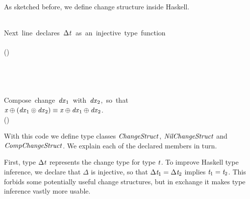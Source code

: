 As sketched before, we define change structure inside Haskell.
\begin{hscode}\SaveRestoreHook
{}%
%
%
\>[B]{}\;\;\;\<[E]%
\\
\>[B]{}\<[3]%
\>[3]{}\mbox{\onelinecomment  Next line declares \ensuremath{\Delta \Varid{t}} as an injective type function}{}\<[E]%
\\
\>[B]{}\<[3]%
\>[3]{}\;\Delta {}\mathrel{=}\mid {}\to {}\<[E]%
\\[\blanklineskip]%
\>[B]{}\<[3]%
\>[3]{}(\oplus)\mathrel{:\mkern-1mu:}\to \Delta {}\to {}\<[E]%
\\
\>[B]{}\<[3]%
\>[3]{}\mathrel{:\mkern-1mu:}\to \Delta {}\<[E]%
\\[\blanklineskip]%
\>[B]{}\;\;\Rightarrow{}\;\;\<[E]%
\\
\>[B]{}\<[3]%
\>[3]{}\NilC{}\mathrel{:\mkern-1mu:}\to \Delta {}\<[E]%
\\[\blanklineskip]%
\>[B]{}\;\;\Rightarrow{}\;\;\<[E]%
\\
\>[B]{}\<[3]%
\>[3]{}\mbox{\onelinecomment  Compose change \ensuremath{\Varid{dx}_{1}} with \ensuremath{\Varid{dx}_{2}}, so that}{}\<[E]%
\\
\>[B]{}\<[3]%
\>[3]{}\mbox{\onelinecomment  \ensuremath{\Varid{x}\oplus (\Varid{dx}_{1}\circledcirc \Varid{dx}_{2})\equiv\Varid{x}\oplus \Varid{dx}_{1}\oplus \Varid{dx}_{2}}.}{}\<[E]%
\\
\>[B]{}\<[3]%
\>[3]{}(\circledcirc )\mathrel{:\mkern-1mu:}\Delta {}\to \Delta {}\to \Delta {}\<[E]%
\ColumnHook
\end{hscode}\resethooks
With this code we define type classes \ensuremath{\Conid{ChangeStruct}}, \ensuremath{\Conid{NilChangeStruct}} and
\ensuremath{\Conid{CompChangeStruct}}. We explain each of the declared members in turn.

First, type \ensuremath{\Delta \Varid{t}} represents the change type for type \ensuremath{\Varid{t}}. To improve Haskell
type inference, we declare that \ensuremath{\Delta} is injective, so that \ensuremath{\Delta \Varid{t}_{1}\mathrel{=}\Delta \Varid{t}_{2}}
implies \ensuremath{\Varid{t}_{1}\mathrel{=}\Varid{t}_{2}}. This forbids some potentially useful change structures, but
in exchange it makes type inference vastly more usable.

